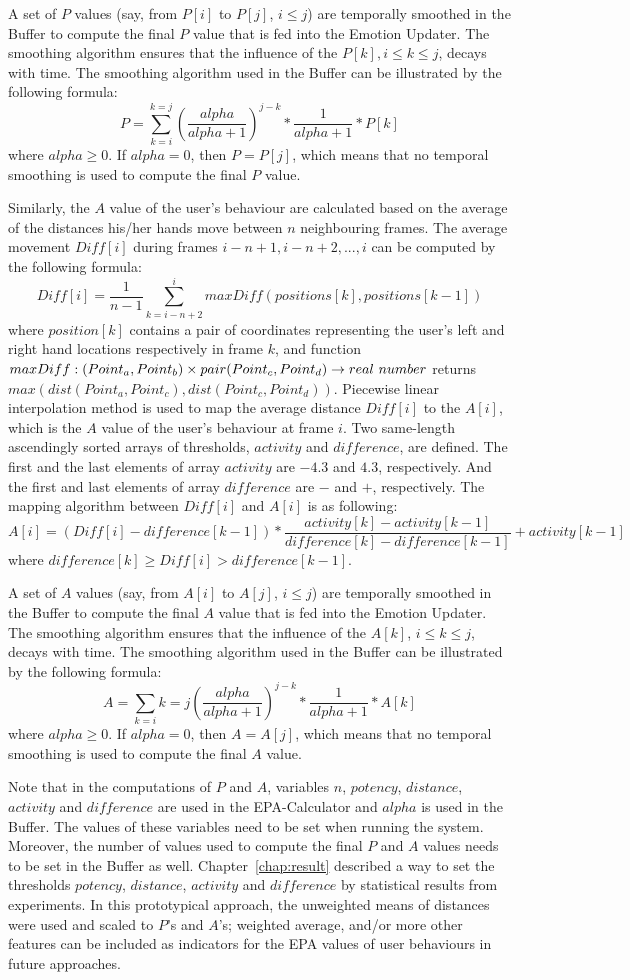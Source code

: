 A set of $P$ values (say, from $P[i]$ to $P[j]$, $i \leq j$) are temporally smoothed in the Buffer to compute the final $P$ value that is fed into the Emotion Updater. The smoothing algorithm ensures that the influence of the $P[k], i \leq k \leq j$, decays with time. The smoothing algorithm used in the Buffer can be illustrated by the following formula:
$$P=\sum_{k=i}^{k=j}(\dfrac{alpha}{alpha+1})^{j-k}*\dfrac{1}{alpha+1}*P[k]$$ where $alpha \geq 0$.
If $alpha=0$, then $P=P[j]$, which means that no temporal smoothing is used to compute the final $P$ value.

Similarly, the $A$ value of the user's behaviour are calculated based on the average of the distances his/her hands move between $n$ neighbouring frames. The average movement $Diff[i]$ during frames $i-n+1, i-n+2, ... , i$ can be computed by the following formula:
$$Diff[i]=\dfrac{1}{n-1}\sum_{k=i-n+2}^{i}maxDiff(positions[k],positions[k-1])$$
where $position[k]$ contains a pair of coordinates representing the user's left and right hand locations respectively in frame $k$, and function $maxDiff: (Point_a, Point_b) \times pair(Point_c,\\ Point_d) \to real\ number$ returns $max(dist(Point_a, Point_c), dist(Point_c, Point_d))$. Piecewise linear interpolation method is used to map the average distance $Diff[i]$ to the $A[i]$, which is the $A$ value of the user's behaviour at frame $i$. Two same-length ascendingly sorted arrays of thresholds, $activity$ and $difference$, are defined. The first and the last elements of array $activity$ are $-4.3$ and $4.3$, respectively. And the first and last elements of array $difference$ are $-$ and $+$, respectively. The mapping algorithm between $Diff[i]$ and $A[i]$ is as following:
$$A[i]=(Diff[i]-difference[k-1])*\dfrac{activity[k] - activity[k-1]}{difference[k] - difference[k-1]}+activity[k-1]$$
where $difference [k] \geq Diff[i] > difference[k-1]$.

A set of $A$ values (say, from $A[i]$ to $A[j]$, $i \leq j$) are temporally smoothed in the Buffer to compute the final $A$ value that is fed into the Emotion Updater. The smoothing algorithm ensures that the influence of the $A[k]$, $i \leq k \leq j$, decays with time. The smoothing algorithm used in the Buffer can be illustrated by the following formula:
$$A=\sum_{k=i}{k=j}(\dfrac{alpha}{alpha+1})^{j-k}*\dfrac{1}{alpha+1}*A[k]$$ where $alpha \geq 0$.
If $alpha=0$, then $A=A[j]$, which means that no temporal smoothing is used to compute the final $A$ value.

Note that in the computations of $P$ and $A$, variables $n$, $potency$, $distance$, $activity$ and $difference$ are used in the EPA-Calculator and $alpha$ is used in the Buffer. The values of these variables need to be set when running the system. Moreover, the number of values used to compute the final $P$ and $A$ values needs to be set in the Buffer as well. Chapter~\ref{chap:result} described a way to set the thresholds $potency$, $distance$, $activity$ and $difference$ by statistical results from experiments. In this prototypical approach, the unweighted means of distances were used and scaled to $P$'s and $A$'s; weighted average, and/or more other features can be included as indicators for the EPA values of user behaviours in future approaches.

